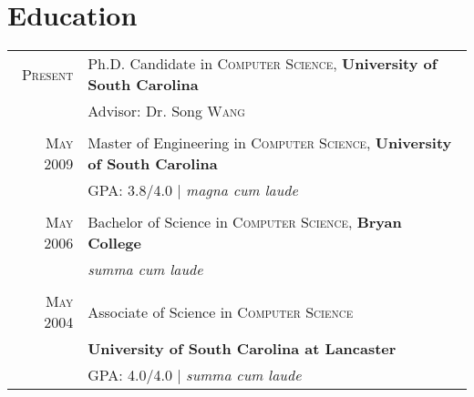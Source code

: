 \documentclass[a4paper,10pt]{article}
\begin{document}
\section{Education}
\begin{tabular}{r p{12cm}}	
 \textsc{Present} & Ph.D. Candidate in \textsc{Computer Science}, \textbf{University of South Carolina}\\
&%
\small Advisor: Dr. Song \textsc{Wang} %
\\&\\
 \textsc{May} 2009 & Master of Engineering in \textsc{Computer Science}, \textbf{University of South Carolina}\\
&\normalsize \textsc{GPA}: 3.8/4.0 | \small\emph{magna cum laude}
\\&\\
\textsc{May} 2006& Bachelor of Science in \textsc{Computer Science}, \textbf{Bryan College} \\
&\normalsize 
\small\emph{summa cum laude}
\\&\\
\textsc{May} 2004& Associate of Science in \textsc{Computer Science}\\
&\textbf{University of South Carolina at Lancaster} \\
&\normalsize \textsc{GPA}: 4.0/4.0 | \small\emph{summa cum laude}\\
\end{tabular}
\end{document}
